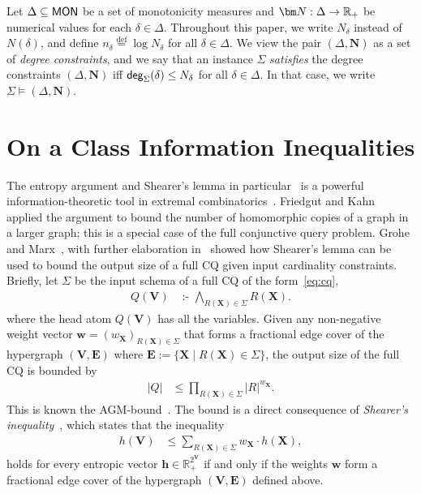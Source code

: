 \documentclass[10pt,a4paper]{article}
\newcommand{\degree}{\text{\sf deg}}
\newcommand{\defeq}{\stackrel{\text{def}}{=}}
\newcommand{\R}{\mathbb R} %
\newcommand{\Rp}{{\mathbb R}_{\tiny +}} %
\newcommand{\cd}{\text{ :- }}
\newcommand{\mon}{\text{\sf MON}}
\begin{document}
Let $\Delta\subseteq\mon$ be a set of monotonicity measures and
$\bm N:\Delta \rightarrow \Rp$ be numerical values for each
$\delta \in\Delta$. Throughout this paper, we write $N_\delta$ instead of $N(\delta)$, and
define $n_\delta \defeq \log N_\delta$ for all $\delta \in\Delta$.  We
view the pair $(\Delta, \bm N)$ as a set of {\em degree constraints},
and we say that an instance $\Sigma$ {\em
  satisfies} the degree constraints $(\Delta, \bm N)$ iff
$\degree_{\Sigma}(\delta) \leq N_\delta$ for all
$\delta \in \Delta$.  In that case, we write~$\Sigma \models (\Delta, \bm N)$.


\section{On a Class Information Inequalities}
\label{sec:info:inequality}

The entropy argument and Shearer's lemma in particular~\cite{MR859293} is a powerful
information-theoretic tool in extremal combinatorics~\cite{entropy-counting}. Friedgut and
Kahn~\cite{MR1639767} applied the argument to bound the number of homomorphic
copies of a graph
in a larger graph; this is a special case of the full conjunctive query problem.
Grohe and Marx~\cite{DBLP:conf/soda/GroheM06}, with further elaboration
in~\cite{DBLP:conf/focs/AtseriasGM08}
showed how Shearer's lemma can be used to bound the output size of a full CQ given input
cardinality constraints.
Briefly, let $\Sigma$ be the input schema of a full CQ of the form~\eqref{eq:cq},
\begin{align}
    Q(\bm V) &\cd  \bigwedge_{R(\bm X)\in \Sigma}R(\bm X). \label{eq:full:cq}
\end{align}
where the head atom $Q(\bm V)$ has all the variables.
Given any non-negative weight vector
$\bm w = (w_{\bm X})_{R(\bm X)\in \Sigma}$
that forms a fractional edge cover of the hypergraph $(\bm V, \bm E)$ where $\bm E := \{\bm X \mid R(\bm
X)\in \Sigma\}$,
the output size of the full CQ is bounded by
\begin{align}
    |Q| &\leq \prod_{R(\bm X)\in \Sigma} |R|^{w_{\bm X}}.
    \label{eqn:agm}
\end{align}
This is known the AGM-bound~\cite{DBLP:journals/siamcomp/AtseriasGM13}.
The bound is a direct consequence of {\em Shearer's inequality}~\cite{MR859293}, which states
that the inequality
\begin{align}
    h(\bm V) &\leq  \sum_{R(\bm X)\in \Sigma} w_{\bm X} \cdot h(\bm X), \label{eqn:shearer}
\end{align}
holds for every entropic vector $\bm h \in \R_+^{2^{\bm V}}$ if and only if the weights $\bm w$
form a fractional edge cover of the hypergraph $(\bm V, \bm E)$ defined above.
\end{document}

